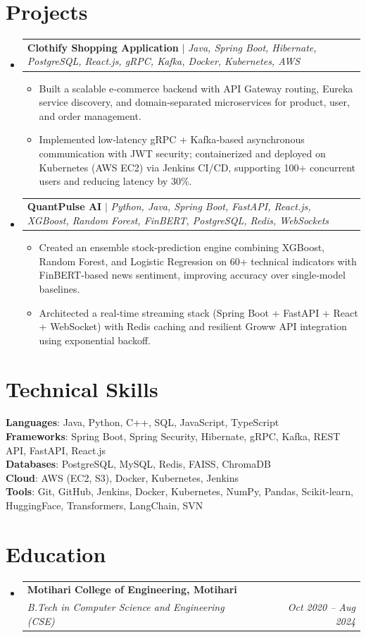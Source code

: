 \documentclass[10pt, letterpaper]{article}
\makeatletter
\newcommand{\resumeItem}[1]{
  \item\small{
    {#1 \vspace{-2pt}}
  }
}
\newcommand{\resumeSubheading}[4]{
  \vspace{-2pt}\item
    \begin{tabular*}{1.0\textwidth}[t]{l@{\extracolsep{\fill}}r}
      \textbf{#1} & \textbf{\small #2} \\
      \textit{\small#3} & \textit{\small #4} \\
    \end{tabular*}\vspace{-7pt}
}
\newcommand{\resumeProjectHeading}[2]{
    \item
    \begin{tabular*}{1.0\textwidth}{l@{\extracolsep{\fill}}r}
      \small#1 & \textbf{\small #2} \\
    \end{tabular*}\vspace{-7pt}
}
\newcommand{\resumeSubHeadingListStart}{\begin{itemize}[leftmargin=0.0in, label={}]}
\newcommand{\resumeSubHeadingListEnd}{\end{itemize}}
\newcommand{\resumeItemListStart}{\begin{itemize}[leftmargin=0.15in]}
\newcommand{\resumeItemListEnd}{\end{itemize}\vspace{-5pt}}
\makeatother
\begin{document}
\section{Projects}
\resumeSubHeadingListStart
  \resumeProjectHeading{\textbf{Clothify Shopping Application} $|$ \emph{Java, Spring Boot, Hibernate, PostgreSQL, React.js, gRPC, Kafka, Docker, Kubernetes, AWS}}{}
    \resumeItemListStart
      \resumeItem{Built a scalable e‑commerce backend with API Gateway routing, Eureka service discovery, and domain‑separated microservices for product, user, and order management.}
      \resumeItem{Implemented low‑latency gRPC + Kafka‑based asynchronous communication with JWT security; containerized and deployed on Kubernetes (AWS EC2) via Jenkins CI/CD, supporting 100+ concurrent users and reducing latency by 30\%.}
    \resumeItemListEnd
  \resumeProjectHeading{\textbf{QuantPulse AI} $|$ \emph{Python, Java, Spring Boot, FastAPI, React.js, XGBoost, Random Forest, FinBERT, PostgreSQL, Redis, WebSockets}}{}
    \resumeItemListStart
      \resumeItem{Created an ensemble stock‑prediction engine combining XGBoost, Random Forest, and Logistic Regression on 60+ technical indicators with FinBERT‑based news sentiment, improving accuracy over single‑model baselines.}
      \resumeItem{Architected a real‑time streaming stack (Spring Boot + FastAPI + React + WebSocket) with Redis caching and resilient Groww API integration using exponential backoff.}
    \resumeItemListEnd
\resumeSubHeadingListEnd


\section{Technical Skills}
\begin{itemize}[leftmargin=0.15in, label={}]
  \small{\item{
    \textbf{Languages}{: Java, Python, C++, SQL, JavaScript, TypeScript} \\
    \textbf{Frameworks}{: Spring Boot, Spring Security, Hibernate, gRPC, Kafka, REST API, FastAPI, React.js} \\
    \textbf{Databases}{: PostgreSQL, MySQL, Redis, FAISS, ChromaDB} \\
    \textbf{Cloud}{: AWS (EC2, S3), Docker, Kubernetes, Jenkins} \\
    \textbf{Tools}{: Git, GitHub, Jenkins, Docker, Kubernetes, NumPy, Pandas, Scikit-learn, HuggingFace, Transformers, LangChain, SVN} \\
  }}
\end{itemize}


\section{Education}
\resumeSubHeadingListStart
  \resumeSubheading{Motihari College of Engineering, Motihari}{}{B.Tech in Computer Science and Engineering (CSE)}{Oct 2020 -- Aug 2024}
\resumeSubHeadingListEnd
\end{document}
